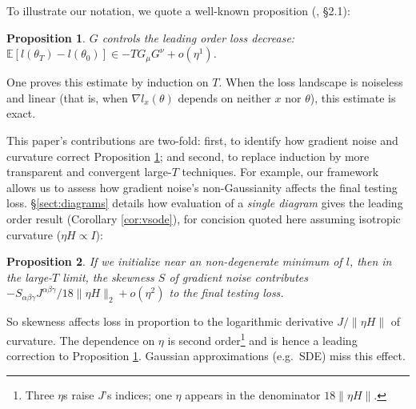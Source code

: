 \documentclass[final,12pt]{colt2021} %
\newtheorem{prop}{Proposition}
\newcommand{\expc}{\mathbb{E}}
\begin{document}

            To illustrate our notation, we quote a well-known proposition
            (\cite{ne04}, \S 2.1):
            \begin{prop}\label{prop:nest}
                $G$ controls the leading order loss decrease:
                $
                    \expc[l(\theta_T) - l(\theta_0)] \in
                    - 
                    T G_\mu G^\nu
                    + o(\eta^1)
                $.
            \end{prop}
            One proves this estimate by induction on $T$.  When the loss
            landscape is noiseless and linear (that is, when $\nabla
            l_x(\theta)$ depends on neither $x$ nor $\theta$), this estimate is
            exact.

            This paper's contributions are two-fold: first, to identify how
            gradient noise and curvature correct Proposition \ref{prop:nest};
            and second, to replace induction by more transparent and convergent
            large-$T$ techniques.
            For example, our framework allows us to assess how gradient noise's
            non-Gaussianity affects the final testing loss.
            \S\ref{sect:diagrams} details how evaluation of a
            \emph{single diagram} gives the leading order result (Corollary
            \ref{cor:vsode}), for concision quoted here assuming isotropic
            curvature ($\eta H \propto I$): 
            \begin{prop}\label{prop:splash}
                If we initialize near an non-degenerate minimum of $l$, then in
                the large-$T$ limit, the skewness $S$ of gradient noise
                contributes 
                $
                    - S_{\alpha\beta\gamma}
                    J^{\alpha\beta\gamma} / 18 \|\eta H\|_2 + o(\eta^2)
                $
                to the final testing loss.  
            \end{prop}
            So skewness affects loss in proportion to the logarithmic
            derivative $J/\|\eta H\|$ of curvature.  The dependence on $\eta$
            is second order\footnote{
                Three $\eta$s raise $J$'s indices; one $\eta$ appears in the
                denominator $18 \|\eta H\|$.
            } and is hence a leading correction
            to Proposition \ref{prop:nest}.  Gaussian approximations (e.g.\
            SDE) miss this effect. 
\end{document}
